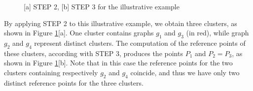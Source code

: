 \begin{figure}[h!]
    \centering
    \qquad
        \caption{[a] STEP 2, [b] STEP 3 for the illustrative example}%
    \label{fig:example3}%
\end{figure}

\noindent
By applying STEP 2 to this illustrative example, we obtain three clusters, as shown in Figure \ref{fig:example3}[a]. One cluster contains graphs $g_1$ and $g_3$ (in red), while graph $g_2$ and $g_4$ represent distinct clusters. The computation of the reference points of these clusters, according with STEP 3, produces the points $P_1$ and $P_2 = P_3$, as shown in Figure  \ref{fig:example3}[b]. Note that in this case the reference points for the two clusters containing respectively $g_2$ and $g_4$ coincide, and thus we have only two distinct reference points for the three clusters.


